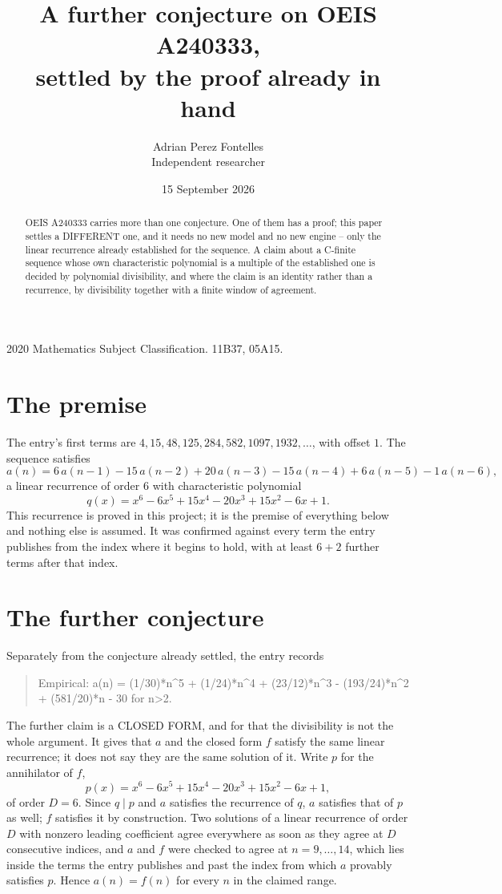\documentclass[11pt,a4paper]{article}
\title{A further conjecture on OEIS A240333,\\ \large settled by the proof already in hand}
\author{Adrian Perez Fontelles\\ \small Independent researcher}
\date{15 September 2026}
\theoremstyle{plain}
\theoremstyle{definition}
\begin{document}
\maketitle

\begin{abstract}
OEIS A240333 carries more than one conjecture. One of them has a proof; this paper settles a
DIFFERENT one, and it needs no new model and no new engine -- only the linear recurrence already
established for the sequence. A claim about a C-finite sequence whose own characteristic
polynomial is a multiple of the established one is decided by polynomial divisibility, and where
the claim is an identity rather than a recurrence, by divisibility together with a finite window
of agreement.
\end{abstract}

\noindent\small 2020 Mathematics Subject Classification. 11B37, 05A15.\normalsize

\section{The premise}

The entry's first terms are $4, 15, 48, 125, 284, 582, 1097, 1932,\dots$, with offset $1$. The sequence satisfies
\[
  a(n)=6\,a(n-1) - 15\,a(n-2) + 20\,a(n-3) - 15\,a(n-4) + 6\,a(n-5) - 1\,a(n-6) ,
\]
a linear recurrence of order $6$ with characteristic polynomial
\[
  q(x)=x^{6} - 6 x^{5} + 15 x^{4} - 20 x^{3} + 15 x^{2} - 6 x + 1 .
\]
This recurrence is proved in this project; it is the premise of everything below and nothing else is assumed.
It was confirmed against every term the entry publishes from the index where it begins to hold,
with at least $6+2$ further terms after that index.

\section{The further conjecture}

Separately from the conjecture already settled, the entry records

\begin{quote}\raggedright Empirical: a(n) = (1/30)*n\^{}5 + (1/24)*n\^{}4 + (23/12)*n\^{}3 - (193/24)*n\^{}2 + (581/20)*n - 30 for n>2.\end{quote}

The further claim is a CLOSED FORM, and for that the divisibility is not the whole argument. It
gives that $a$ and the closed form $f$ satisfy the same linear recurrence; it does not say they
are the same solution of it. Write $p$ for the annihilator of $f$,
\[
  p(x)=x^{6} - 6 x^{5} + 15 x^{4} - 20 x^{3} + 15 x^{2} - 6 x + 1 ,
\]
of order $D=6$. Since $q\mid p$ and $a$ satisfies the recurrence of $q$, $a$ satisfies that of
$p$ as well; $f$ satisfies it by construction. Two solutions of a linear recurrence of order $D$
with nonzero leading coefficient agree everywhere as soon as they agree at $D$ consecutive
indices, and $a$ and $f$ were checked to agree at $n=9,\dots,14$,
which lies inside the terms the entry publishes and past the index from which $a$ provably
satisfies $p$. Hence $a(n)=f(n)$ for every $n$ in the claimed range.
\end{document}
